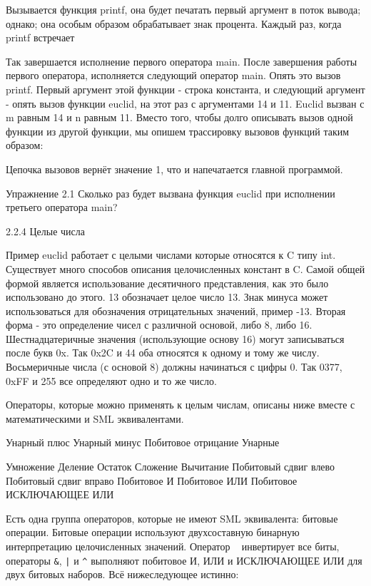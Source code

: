 Вызывается функция printf, она будет печатать первый аргумент в поток вывода; однако; она особым образом обрабатывает знак процента. Каждый раз, когда printf встречает %

Так завершается исполнение первого оператора main. После завершения работы первого оператора, исполняется следующий оператор main. Опять это вызов printf. Первый аргумент этой функции - строка константа, и следующий аргумент - опять вызов функции euclid, на этот раз с аргументами 14 и 11. Euclid вызван с m равным 14 и n равным 11. Вместо того, чтобы долго описывать вызов одной функции из другой функции, мы опишем трассировку вызовов функций таким образом:

Цепочка вызовов вернёт значение 1, что и напечатается главной программой.

Упражнение 2.1 Сколько раз будет вызвана функция euclid при исполнении третьего оператора main?

2.2.4 Целые числа

Пример euclid работает с целыми числами которые относятся к C типу int. Существует много способов описания целочисленных констант в C. Самой общей формой является использование десятичного представления, как это было использовано до этого. 13 обозначает целое число 13. Знак минуса может использоваться для обозначения отрицательных значений, пример -13. Вторая форма - это определение чисел с различной основой, либо 8, либо 16. Шестнадцатеричные значения (использующие основу 16) могут записываться после букв 0x. Так 0x2C и 44 оба относятся к одному и тому же числу. Восьмеричные числа (с основой 8) должны начинаться с цифры 0. Так 0377, 0xFF и 255 все определяют одно и то же число.

Операторы, которые можно применять к целым числам, описаны ниже вместе с математическими и SML эквивалентами.

Унарный плюс
Унарный минус
Побитовое отрицание
Унарные

Умножение
Деление
Остаток
Сложение
Вычитание
Побитовый сдвиг влево
Побитовый сдвиг вправо
Побитовое И
Побитовое ИЛИ
Побитовое ИСКЛЮЧАЮЩЕЕ ИЛИ

Есть одна группа операторов, которые не имеют SML эквивалента: битовые операции. Битовые операции используют двухсоставную бинарную интерпретацию целочисленных значений. Оператор ~ инвертирует все биты, операторы \lstinline|&|, \lstinline!|! и \lstinline|^| выполняют побитовое И, ИЛИ и ИСКЛЮЧАЮЩЕЕ ИЛИ для двух битовых наборов. Всё нижеследующее истинно:

